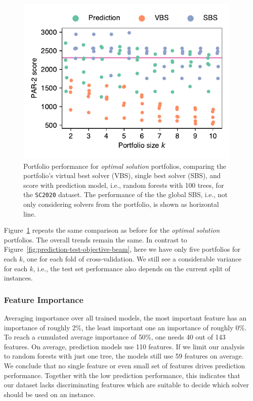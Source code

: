 \documentclass[conference]{IEEEtran}
\begin{document}
\begin{figure}[t]
	\centering
	\includegraphics[width=0.9\columnwidth]{plots/prediction-test-objective-optimal-2020.pdf}
	\caption{
		Portfolio performance for \emph{optimal solution} portfolios, comparing the portfolio's virtual best solver (VBS), single best solver (SBS), and score with prediction model, i.e., random forests with 100 trees, for the \texttt{SC2020} dataset.
		The performance of the the global SBS, i.e., not only considering solvers from the portfolio, is shown as horizontal line.
	}
	\label{fig:prediction-test-objective-optimal-2020}
\end{figure}

Figure~\ref{fig:prediction-test-objective-optimal-2020} repeats the same comparison as before for the \emph{optimal solution} portfolios.
The overall trends remain the same.
In contrast to Figure~\ref{fig:prediction-test-objective-beam}, here we have only five portfolios for each $k$, one for each fold of cross-validation.
We still see a considerable variance for each $k$, i.e., the test set performance also depends on the current split of instances.

\subsubsection{Feature Importance}

Averaging importance over all trained models, the most important feature has an importance of roughly 2\%, the least important one an importance of roughly 0\%.
To reach a cumulated average importance of 50\%, one needs 40 out of 143 features.
On average, prediction models use 110 features.
If we limit our analysis to random forests with just one tree, the models still use 59 features on average.
We conclude that no single feature or even small set of features drives prediction performance.
Together with the low prediction performance, this indicates that our dataset lacks discriminating features which are suitable to decide which solver should be used on an instance.
\end{document}
